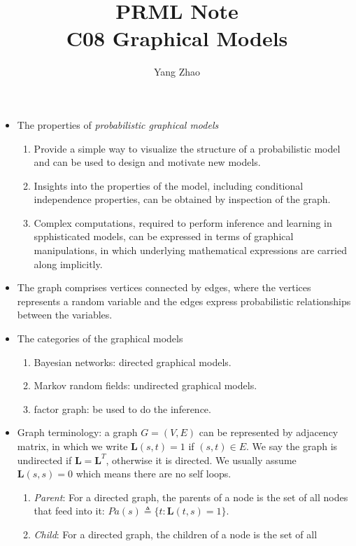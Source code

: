 \documentclass[12pt, a4paper]{article}
\title{PRML Note\\C08 Graphical Models}
\author{Yang Zhao}
\affil{Department of Automation, Tsinghua University}
\date{}
\begin{document}
    \maketitle
    \begin{itemize}
        \item The properties of \textit{probabilistic graphical models}\begin{enumerate}
            \item Provide a simple way to visualize the structure of a probabilistic model
            and can be used to design and motivate new models.
            \item Insights into the properties of the model, including conditional independence
            properties, can be obtained by inspection of the graph. 
            \item Complex computations, required to perform inference and learning in spphisticated
            models, can be expressed in terms of graphical manipulations, in which underlying 
            mathematical expressions are carried along implicitly.
        \end{enumerate}
        \item The graph comprises vertices connected by edges, where the vertices represents a 
        random variable and the edges express probabilistic relationships between the variables.
        \item The categories of the graphical models\begin{enumerate}
            \item Bayesian networks: directed graphical models. 
            \item Markov random fields: undirected graphical models.
            \item factor graph: be used to do the inference.
        \end{enumerate}
        \item Graph terminology: a graph $G=(V,E)$ can be represented by adjacency matrix, in which
        we write $\mathbf{L}(s,t)=1$ if $(s,t)\in E$. We say the graph is undirected if $\mathbf{L}
        =\mathbf{L}^T$, otherwise it is directed. We usually assume $\mathbf{L}(s,s)=0$ which means
        there are no self loops.\begin{enumerate}
            \item \textit{Parent}: For a directed graph, the parents of a node is the set of all 
            nodes that feed into it: $Pa(s)\triangleq\{t:\mathbf{L}(t,s)=1\}$. 
            \item \textit{Child}: For a directed graph, the children of a node is the set of all 

\end{enumerate}
\end{itemize}
\end{document}
